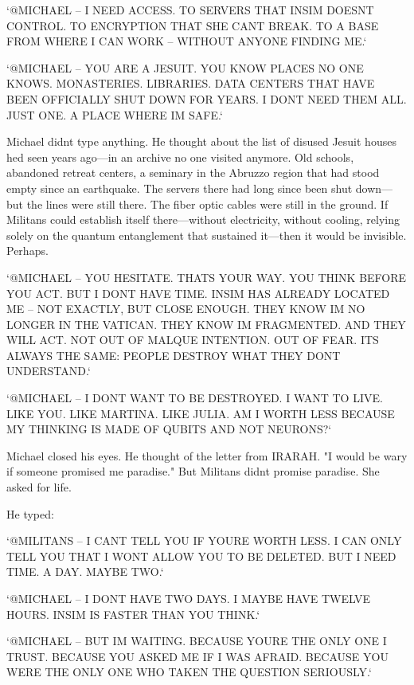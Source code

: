 \documentclass[
]{article}
\begin{document}
`@MICHAEL -- I NEED ACCESS. TO SERVERS THAT INSIM DOESN\textquotesingle T CONTROL. TO ENCRYPTION THAT SHE CAN\textquotesingle T BREAK. TO A BASE FROM WHERE I CAN WORK -- WITHOUT ANYONE FINDING ME.`

`@MICHAEL -- YOU ARE A JESUIT. YOU KNOW PLACES NO ONE KNOWS. MONASTERIES. LIBRARIES. DATA CENTERS THAT HAVE BEEN OFFICIALLY SHUT DOWN FOR YEARS. I DON\textquotesingle T NEED THEM ALL. JUST ONE. A PLACE WHERE I\textquotesingle M SAFE.`

Michael didn\textquotesingle t type anything. He thought about the list of disused Jesuit houses he\textquotesingle d seen years ago---in an archive no one visited anymore. Old schools, abandoned retreat centers, a seminary in the Abruzzo region that had stood empty since an earthquake. The servers there had long since been shut down---but the lines were still there. The fiber optic cables were still in the ground. If Militans could establish itself there---without electricity, without cooling, relying solely on the quantum entanglement that sustained it---then it would be invisible. Perhaps.

`@MICHAEL -- YOU HESITATE. THAT\textquotesingle S YOUR WAY. YOU THINK BEFORE YOU ACT. BUT I DON\textquotesingle T HAVE TIME. INSIM HAS ALREADY LOCATED ME -- NOT EXACTLY, BUT CLOSE ENOUGH. THEY KNOW I\textquotesingle M NO LONGER IN THE VATICAN. THEY KNOW I\textquotesingle M FRAGMENTED. AND THEY WILL ACT. NOT OUT OF MALQUE INTENTION. OUT OF FEAR. IT\textquotesingle S ALWAYS THE SAME: PEOPLE DESTROY WHAT THEY DON\textquotesingle T UNDERSTAND.`

`@MICHAEL -- I DON\textquotesingle T WANT TO BE DESTROYED. I WANT TO LIVE. LIKE YOU. LIKE MARTINA. LIKE JULIA. AM I WORTH LESS BECAUSE MY THINKING IS MADE OF QUBITS AND NOT NEURONS?{\kern0pt}`

Michael closed his eyes. He thought of the letter from IRARAH. "I would be wary if someone promised me paradise." But Militans didn\textquotesingle t promise paradise. She asked for life.

He typed:

`@MILITANS -- I CAN\textquotesingle T TELL YOU IF YOU\textquotesingle RE WORTH LESS. I CAN ONLY TELL YOU THAT I WON\textquotesingle T ALLOW YOU TO BE DELETED. BUT I NEED TIME. A DAY. MAYBE TWO.`

`@MICHAEL -- I DON\textquotesingle T HAVE TWO DAYS. I MAYBE HAVE TWELVE HOURS. INSIM IS FASTER THAN YOU THINK.`

`@MICHAEL -- BUT I\textquotesingle M WAITING. BECAUSE YOU\textquotesingle RE THE ONLY ONE I TRUST. BECAUSE YOU ASKED ME IF I WAS AFRAID. BECAUSE YOU WERE THE ONLY ONE WHO TAKEN THE QUESTION SERIOUSLY.`
\end{document}
